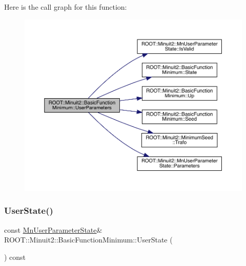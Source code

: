 Here is the call graph for this function\+:
\nopagebreak
\begin{figure}[H]
\begin{center}
\leavevmode
\includegraphics[width=350pt]{de/d25/classROOT_1_1Minuit2_1_1BasicFunctionMinimum_aa6fa4f1678939015849b6a2ab6023238_cgraph}
\end{center}
\end{figure}
\mbox{\label{classROOT_1_1Minuit2_1_1BasicFunctionMinimum_ac1757a094afe32c23b548fafaff5acc1}} 
\subsubsection{\texorpdfstring{UserState()}{UserState()}\hspace{0.1cm}{\footnotesize\ttfamily [1/2]}}
{\footnotesize\ttfamily const \mbox{\hyperlink{classROOT_1_1Minuit2_1_1MnUserParameterState}{Mn\+User\+Parameter\+State}}\& R\+O\+O\+T\+::\+Minuit2\+::\+Basic\+Function\+Minimum\+::\+User\+State (\begin{DoxyParamCaption}{ }\end{DoxyParamCaption}) const\hspace{0.3cm}{\ttfamily [inline]}}

